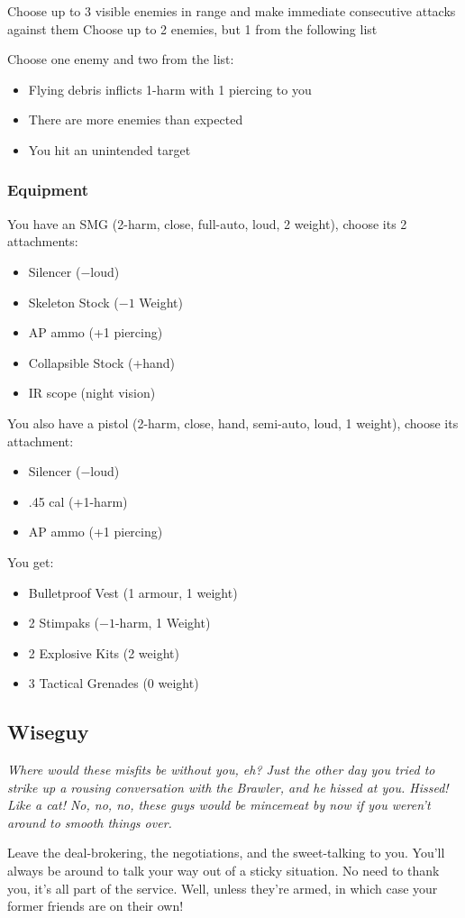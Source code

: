 {Choose up to 3 visible enemies in range and make immediate consecutive attacks against them}
{Choose up to 2 enemies, but 1 from the following list}
{Choose one enemy and two from the list:
\begin{itemize}
\item Flying debris inflicts 1-harm with 1 piercing to you
\item There are more enemies than expected
\item You hit an unintended target
\end{itemize}}

\subsubsection{Equipment}
You have an SMG (2-harm, close, full-auto, loud, 2 weight), choose its 2 attachments:
\begin{itemize}
\item Silencer ($-$loud)
\item Skeleton Stock ($-1$ Weight)
\item AP ammo (+1 piercing)
\item Collapsible Stock (+hand)
\item IR scope (night vision)
\end{itemize}

You also have a pistol (2-harm, close, hand, semi-auto, loud, 1 weight), choose its attachment:
\begin{itemize}
\item Silencer ($-$loud)
\item .45 cal (+1-harm)
\item AP ammo (+1 piercing)
\end{itemize}

You get:
\begin{itemize}
\item Bulletproof Vest (1 armour, 1 weight)
\item 2 Stimpaks ($-1$-harm, 1 Weight)
\item 2 Explosive Kits (2 weight)
\item 3 Tactical Grenades (0 weight)
\end{itemize}



\subsection{Wiseguy}
{\itshape Where would these misfits be without you, eh? Just the other day you tried to strike up a rousing conversation with the Brawler, and he \emph{hissed} at you. Hissed! Like a cat! No, no, no, these guys would be mincemeat by now if you weren't around to smooth things over.

Leave the deal-brokering, the negotiations, and the sweet-talking to you. You'll always be around to talk your way out of a sticky situation. No need to thank you, it's all part of the service. Well, unless they're armed, in which case your former friends are on their own!}
